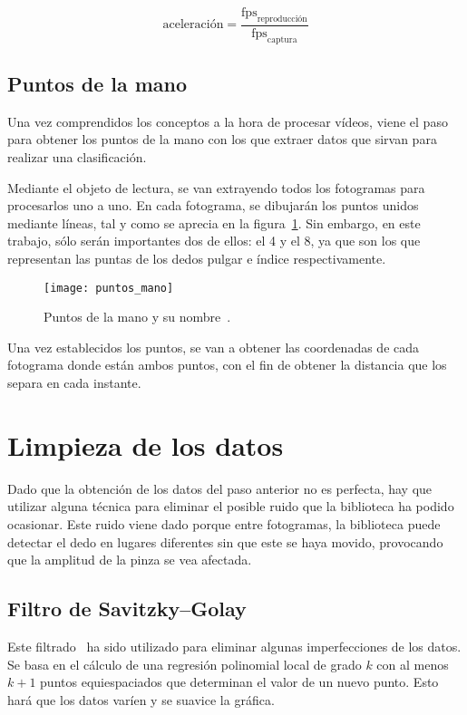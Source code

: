 \begin{equation}
	\text{aceleración} = \frac{\text{fps}_{\text{reproducción}}}{\text{fps}_{\text{captura}}}
\end{equation} 

\subsection{Puntos de la mano}
Una vez comprendidos los conceptos a la hora de procesar vídeos, viene el paso para obtener los puntos de la mano con los que extraer datos que sirvan para realizar una clasificación.

Mediante el objeto de lectura, se van extrayendo todos los fotogramas para procesarlos uno a uno. En cada fotograma, se dibujarán los puntos unidos mediante líneas, tal y como se aprecia en la figura~\ref{fig:puntosmano}. Sin embargo, en este trabajo, sólo serán importantes dos de ellos: el 4 y el 8, ya que son los que representan las puntas de los dedos pulgar e índice respectivamente.

\begin{figure}[h]
	\texttt{[image: puntos\_mano]}
	\centering
	\caption[Puntos de la mano y su nombre.]{Puntos de la mano y su nombre~\cite{mediapipehands}.}
	\label{fig:puntosmano}
\end{figure}

Una vez establecidos los puntos, se van a obtener las coordenadas de cada fotograma donde están ambos puntos, con el fin de obtener la distancia que los separa en cada instante.

\section{Limpieza de los datos}
Dado que la obtención de los datos del paso anterior no es perfecta, hay que utilizar alguna técnica para eliminar el posible ruido que la biblioteca ha podido ocasionar. Este ruido viene dado porque entre fotogramas, la biblioteca puede detectar el dedo en lugares diferentes sin que este se haya movido, provocando que la amplitud de la pinza se vea afectada.

\subsection{Filtro de Savitzky–Golay}
Este filtrado~\cite{wiki:savgol} ha sido utilizado para eliminar algunas imperfecciones de los datos. Se basa en el cálculo de una regresión polinomial local de grado $k$ con al menos $k+1$ puntos equiespaciados que determinan el valor de un nuevo punto. Esto hará que los datos varíen y se suavice la gráfica. 

